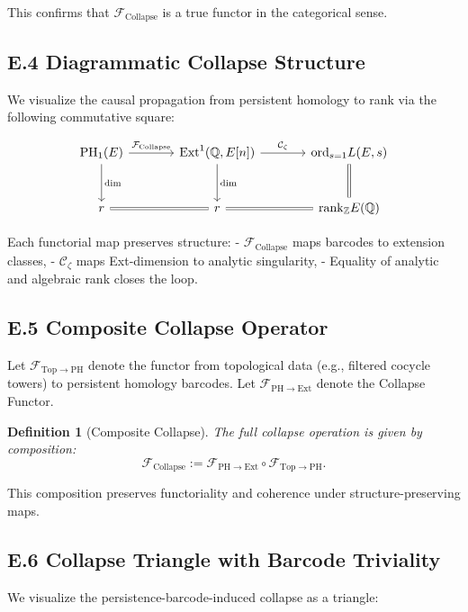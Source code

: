 \documentclass[11pt]{article}
\newtheorem{definition}[theorem]{Definition}
\DeclareMathOperator{\Ext}{Ext}
\DeclareMathOperator{\PH}{PH}
\newcommand{\QQ}{\mathbb{Q}}
\newcommand{\ZZ}{\mathbb{Z}}
\begin{document}
This confirms that $\mathcal{F}_{\mathrm{Collapse}}$ is a true functor in the categorical sense.

\subsection*{E.4 Diagrammatic Collapse Structure}

We visualize the causal propagation from persistent homology to rank via the following commutative square:

\[
\begin{tikzcd}[row sep=large, column sep=large]
\PH_1(E) \arrow[r, "\mathcal{F}_{\mathrm{Collapse}}"] \arrow[d, "\dim"]
& \Ext^1(\QQ,E[n]) \arrow[d, "\dim"] \arrow[r, "\mathcal{C}_\zeta"]
& \mathrm{ord}_{s=1} L(E,s) \arrow[d, equal] \\
r \arrow[r, equal] & r \arrow[r, equal] & \mathrm{rank}_{\ZZ} E(\QQ)
\end{tikzcd}
\]


Each functorial map preserves structure:
- $\mathcal{F}_{\mathrm{Collapse}}$ maps barcodes to extension classes,
- $\mathcal{C}_\zeta$ maps Ext-dimension to analytic singularity,
- Equality of analytic and algebraic rank closes the loop.

\subsection*{E.5 Composite Collapse Operator}

Let $\mathcal{F}_{\mathrm{Top} \to \mathrm{PH}}$ denote the functor from topological data (e.g., filtered cocycle towers) to persistent homology barcodes.  
Let $\mathcal{F}_{\mathrm{PH} \to \mathrm{Ext}}$ denote the Collapse Functor.

\begin{definition}[Composite Collapse]
The full collapse operation is given by composition:
\[
\mathcal{F}_{\mathrm{Collapse}} := \mathcal{F}_{\mathrm{PH} \to \mathrm{Ext}} \circ \mathcal{F}_{\mathrm{Top} \to \mathrm{PH}}.
\]
\end{definition}

This composition preserves functoriality and coherence under structure-preserving maps.

\subsection*{E.6 Collapse Triangle with Barcode Triviality}

We visualize the persistence-barcode-induced collapse as a triangle:
\end{document}
